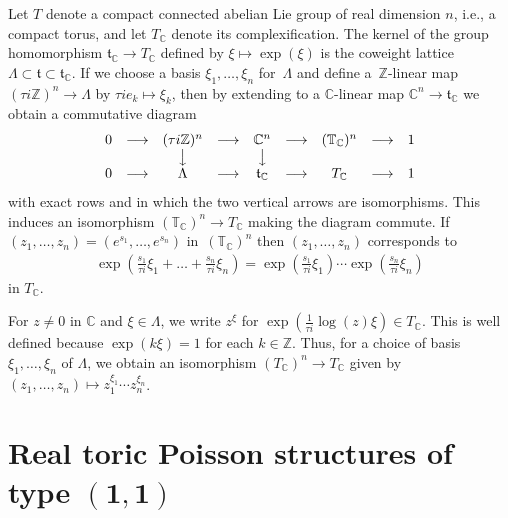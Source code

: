 \documentclass[10pt,a4paper]{amsart}
\numberwithin{equation}{section}
\begin{document}
Let $T$ denote a compact connected abelian Lie group of real dimension $n$, i.e., a compact torus, and let $T_{\mathbb C}$ denote its complexif\/ication. The kernel of the group homomorphism ${\mathfrak t}_{\mathbb C}\to T_{\mathbb C}$ def\/ined by $\xi\mapsto \exp(\xi)$ is the coweight lattice $\Lambda\subset {\mathfrak t}\subset {\mathfrak t}_{\mathbb C}$. If we choose a basis $\xi_1,\dots,\xi_n$ for~$\Lambda$ and def\/ine a~${\mathbb Z}$-linear map $(\tau i{\mathbb Z})^n\to \Lambda$ by $\tau ie_k\mapsto \xi_k$, then by extending to a ${\mathbb C}$-linear map ${\mathbb C}^n\to {\mathfrak t}_{\mathbb C}$ we obtain a commutative diagram
\begin{gather*}
\begin{matrix}
0 & \longrightarrow & (\tau i{\mathbb Z})^n & \longrightarrow & {\mathbb C}^n & \longrightarrow & ({\mathbb T}_{\mathbb C})^n & \longrightarrow & 1 \\
 & & \big\downarrow & & \big\downarrow & & & & \\
0 & \longrightarrow & \Lambda & \longrightarrow & {\mathfrak t}_{\mathbb C} & \longrightarrow & T_{\mathbb C} & \longrightarrow & 1
\end{matrix}
\end{gather*}
with exact rows and in which the two vertical arrows are isomorphisms. This induces an isomorphism $({\mathbb T}_{\mathbb C})^n\to T_{\mathbb C}$ making the diagram commute. If $(z_1,\dots,z_n)=(e^{s_1},\dots,e^{s_n})$ in~$({\mathbb T}_{\mathbb C})^n$ then $(z_1,\dots,z_n)$ corresponds to
\begin{gather*}
\exp\left(\frac{s_1}{\tau i}\xi_1+\dots+\frac{s_n}{\tau i}\xi_n\right)=\exp\left(\frac{s_1}{\tau i}\xi_1\right)\cdots \exp\left(\frac{s_n}{\tau i}\xi_n\right)
\end{gather*}
in $T_{\mathbb C}$.

\begin{Note}\label{isom_with_std_torus}
For $z\not=0$ in ${\mathbb C}$ and $\xi\in \Lambda$, we write $z^\xi$ for $\exp(\frac{1}{\tau i}\log(z)\xi)\in T_{\mathbb C}$. This is well def\/ined because $\exp(k\xi)=1$ for each $k\in{\mathbb Z}$. Thus, for a choice of basis $\xi_1,\dots,\xi_n$ of $\Lambda$, we obtain an isomorphism $(T_{\mathbb C})^n\to T_{\mathbb C}$ given by $(z_1,\dots,z_n)\mapsto z_1^{\xi_1}\cdots z_n^{\xi_n}$.
\end{Note}

\section[Real toric Poisson structures of type $(1,1)$]{Real toric Poisson structures of type $\boldsymbol{(1,1)}$}
\end{document}
